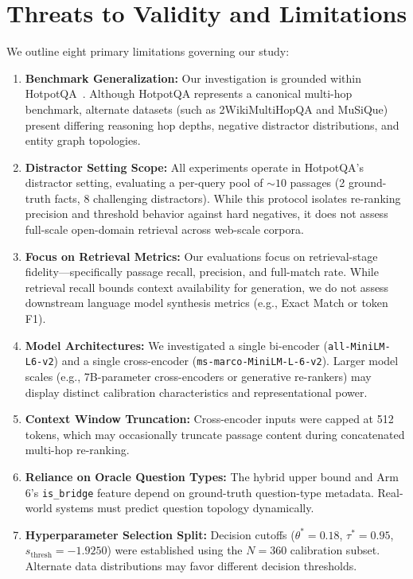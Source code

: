 \documentclass[conference]{IEEEtran}
\begin{document}
\section{Threats to Validity and Limitations}
\label{sec:threats}
We outline eight primary limitations governing our study:
\begin{enumerate}\setlength{\itemsep}{0pt}\setlength{\parsep}{0pt}\setlength{\parskip}{0pt}
    \item \textbf{Benchmark Generalization:} Our investigation is grounded within HotpotQA~\cite{yang2018hotpotqa}. Although HotpotQA represents a canonical multi-hop benchmark, alternate datasets (such as 2WikiMultiHopQA and MuSiQue) present differing reasoning hop depths, negative distractor distributions, and entity graph topologies.
    \item \textbf{Distractor Setting Scope:} All experiments operate in HotpotQA's distractor setting, evaluating a per-query pool of $\sim 10$ passages (2 ground-truth facts, 8 challenging distractors). While this protocol isolates re-ranking precision and threshold behavior against hard negatives, it does not assess full-scale open-domain retrieval across web-scale corpora.
    \item \textbf{Focus on Retrieval Metrics:} Our evaluations focus on retrieval-stage fidelity—specifically passage recall, precision, and full-match rate. While retrieval recall bounds context availability for generation, we do not assess downstream language model synthesis metrics (e.g., Exact Match or token F1).
    \item \textbf{Model Architectures:} We investigated a single bi-encoder (\texttt{all-MiniLM-L6-v2}) and a single cross-encoder (\texttt{ms-marco-MiniLM-L-6-v2}). Larger model scales (e.g., 7B-parameter cross-encoders or generative re-rankers) may display distinct calibration characteristics and representational power.
    \item \textbf{Context Window Truncation:} Cross-encoder inputs were capped at 512 tokens, which may occasionally truncate passage content during concatenated multi-hop re-ranking.
    \item \textbf{Reliance on Oracle Question Types:} The hybrid upper bound and Arm 6's \texttt{is\_bridge} feature depend on ground-truth question-type metadata. Real-world systems must predict question topology dynamically.
    \item \textbf{Hyperparameter Selection Split:} Decision cutoffs ($\theta^*=0.18$, $\tau^*=0.95$, $s_{\text{thresh}}=-1.9250$) were established using the $N=360$ calibration subset. Alternate data distributions may favor different decision thresholds.

\end{enumerate}
\end{document}
